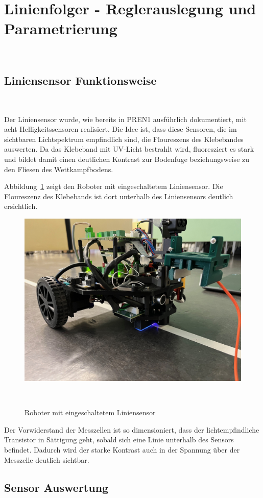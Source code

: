 \documentclass[main.tex]{subfiles} %
\begin{document}

\section{Linienfolger - Reglerauslegung und Parametrierung}~\label{apdx:LineFollowerRegler}

\subsection*{Liniensensor Funktionsweise}~\label{apdx:Liniensensor_auswertung}

Der Liniensensor wurde, wie bereits in PREN1 ausführlich dokumentiert, mit acht
Helligkeitssensoren realisiert. Die Idee ist, dass diese Sensoren, die im
sichtbaren Lichtspektrum empfindlich sind, die Floureszens des Klebebandes
auswerten. Da das Klebeband mit UV-Licht bestrahlt wird, fluoresziert es stark
und bildet damit einen deutlichen Kontrast zur Bodenfuge beziehungsweise zu den
Fliesen des Wettkampfbodens.

Abbildung~\ref{fig:LinienSensor_aktiv} zeigt den Roboter mit eingeschaltetem
Liniensensor. Die Floureszenz des Klebebands ist dort unterhalb des
Liniensensors deutlich ersichtlich.

\begin{figure}[H]
    \centering
    \includegraphics[width=0.5\linewidth]{fig_Parametrierung_Linienfolgeregler/Bild_Roboter_Sensor_aktiv.jpg}
    \caption{Roboter mit eingeschaltetem Liniensensor}~\label{fig:LinienSensor_aktiv}
\end{figure}

Der Vorwiderstand der Messzellen ist so dimensioniert, dass der
lichtempfindliche Transistor in Sättigung geht, sobald sich eine Linie
unterhalb des Sensors befindet. Dadurch wird der starke Kontrast auch in der
Spannung über der Messzelle deutlich sichtbar.

\subsection*{Sensor Auswertung}
\end{document}
